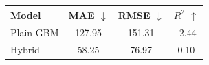 \begin{tabular}{lccc}
\toprule
Model & MAE $\downarrow$ & RMSE $\downarrow$ & $R^2$ $\uparrow$ \\
\midrule
Plain GBM & 127.95 & 151.31 & -2.44 \\
Hybrid & 58.25 & 76.97 & 0.10 \\
\bottomrule
\end{tabular}
